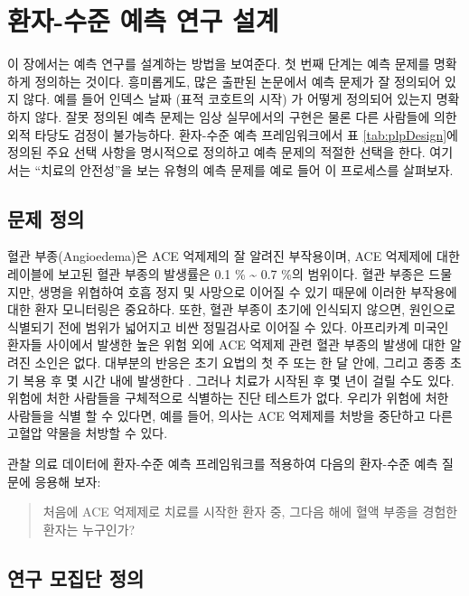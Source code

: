 \documentclass[11pt]{book}
\theoremstyle{definition}
\theoremstyle{definition}
\theoremstyle{definition}
\theoremstyle{remark}
\begin{document}
\section{환자-수준 예측 연구 설계}\label{----}

이 장에서는 예측 연구를 설계하는 방법을 보여준다. 첫 번째 단계는 예측
문제를 명확하게 정의하는 것이다. 흥미롭게도, 많은 출판된 논문에서 예측
문제가 잘 정의되어 있지 않다. 예를 들어 인덱스 날짜 (표적 코호트의 시작)
가 어떻게 정의되어 있는지 명확하지 않다. 잘못 정의된 예측 문제는 임상
실무에서의 구현은 물론 다른 사람들에 의한 외적 타당도 검정이 불가능하다.
환자-수준 예측 프레임워크에서 표 \ref{tab:plpDesign}에 정의된 주요 선택
사항을 명시적으로 정의하고 예측 문제의 적절한 선택을 한다. 여기서는
``치료의 안전성''을 보는 유형의 예측 문제를 예로 들어 이 프로세스를
살펴보자. 

\subsection{문제 정의}\label{--3}

혈관 부종(Angioedema)은 ACE 억제제의 잘 알려진 부작용이며, ACE 억제제에
대한 레이블에 보고된 혈관 부종의 발생률은 0.1 \% \textasciitilde{} 0.7
\%의 범위이다. \citep{byrd_2006} 혈관 부종은 드물지만, 생명을 위협하여
호흡 정지 및 사망으로 이어질 수 있기 때문에 이러한 부작용에 대한 환자
모니터링은 중요하다. \citep{norman_2013} 또한, 혈관 부종이 초기에
인식되지 않으면, 원인으로 식별되기 전에 범위가 넓어지고 비싼 정밀검사로
이어질 수 있다. \citep{norman_2013, thompson_1993} 아프리카계 미국인
환자들 사이에서 발생한 높은 위험 외에 ACE 억제제 관련 혈관 부종의 발생에
대한 알려진 소인은 없다. \citep{byrd_2006} 대부분의 반응은 초기 요법의
첫 주 또는 한 달 안에, 그리고 종종 초기 복용 후 몇 시간 내에 발생한다
\citep{circardi_2004}. 그러나 치료가 시작된 후 몇 년이 걸릴 수도 있다.
\citep{mara_1996} 위험에 처한 사람들을 구체적으로 식별하는 진단 테스트가
없다. 우리가 위험에 처한 사람들을 식별 할 수 있다면, 예를 들어, 의사는
ACE 억제제를 처방을 중단하고 다른 고혈압 약물을 처방할 수
있다. 

관찰 의료 데이터에 환자-수준 예측 프레임워크를 적용하여 다음의 환자-수준
예측 질문에 응용해 보자:

\begin{quote}
처음에 ACE 억제제로 치료를 시작한 환자 중, 그다음 해에 혈액 부종을
경험한 환자는 누구인가?
\end{quote}

\subsection{연구 모집단 정의}\label{--}
\end{document}
